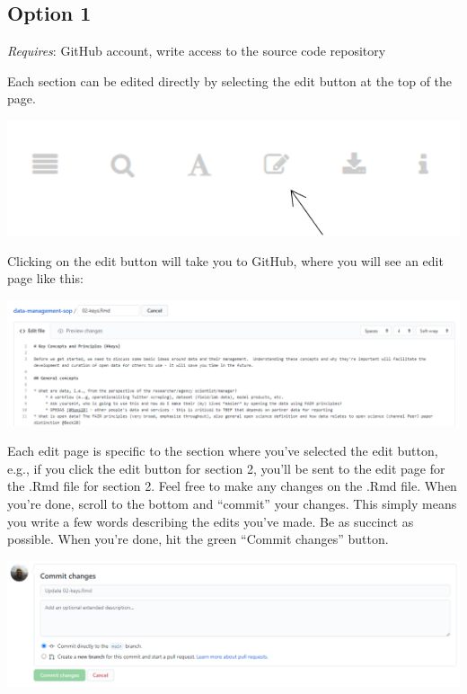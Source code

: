 \documentclass[
]{book}
\begin{document}
\subsection{Option 1}\label{opt1}

\emph{Requires}: GitHub account, write access to the source code repository

Each section can be edited directly by selecting the edit button at the top of the page.

\begin{center}\includegraphics[width=1\linewidth]{img/editarrow} \end{center}

Clicking on the edit button will take you to GitHub, where you will see an edit page like this:

\begin{center}\includegraphics[width=1\linewidth]{img/editme} \end{center}

Each edit page is specific to the section where you've selected the edit button, e.g., if you click the edit button for section 2, you'll be sent to the edit page for the .Rmd file for section 2. Feel free to make any changes on the .Rmd file. When you're done, scroll to the bottom and ``commit'' your changes. This simply means you write a few words describing the edits you've made. Be as succinct as possible. When you're done, hit the green ``Commit changes'' button.

\begin{center}\includegraphics[width=1\linewidth]{img/editme2} \end{center}
\end{document}
